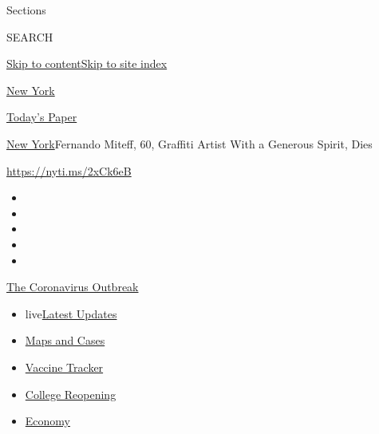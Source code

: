 Sections

SEARCH

\protect\hyperlink{site-content}{Skip to
content}\protect\hyperlink{site-index}{Skip to site index}

\href{https://www.nytimes.com/section/nyregion}{New York}

\href{https://myaccount.nytimes.com/auth/login?response_type=cookie\&client_id=vi}{}

\href{https://www.nytimes.com/section/todayspaper}{Today's Paper}

\href{/section/nyregion}{New York}\textbar{}Fernando Miteff, 60,
Graffiti Artist With a Generous Spirit, Dies

\url{https://nyti.ms/2xCk6eB}

\begin{itemize}
\item
\item
\item
\item
\item
\end{itemize}

\href{https://www.nytimes.com/news-event/coronavirus?action=click\&pgtype=Article\&state=default\&region=TOP_BANNER\&context=storylines_menu}{The
Coronavirus Outbreak}

\begin{itemize}
\tightlist
\item
  live\href{https://www.nytimes.com/2020/08/03/world/coronavirus-covid-19.html?action=click\&pgtype=Article\&state=default\&region=TOP_BANNER\&context=storylines_menu}{Latest
  Updates}
\item
  \href{https://www.nytimes.com/interactive/2020/us/coronavirus-us-cases.html?action=click\&pgtype=Article\&state=default\&region=TOP_BANNER\&context=storylines_menu}{Maps
  and Cases}
\item
  \href{https://www.nytimes.com/interactive/2020/science/coronavirus-vaccine-tracker.html?action=click\&pgtype=Article\&state=default\&region=TOP_BANNER\&context=storylines_menu}{Vaccine
  Tracker}
\item
  \href{https://www.nytimes.com/2020/08/02/us/covid-college-reopening.html?action=click\&pgtype=Article\&state=default\&region=TOP_BANNER\&context=storylines_menu}{College
  Reopening}
\item
  \href{https://www.nytimes.com/live/2020/08/03/business/stock-market-today-coronavirus?action=click\&pgtype=Article\&state=default\&region=TOP_BANNER\&context=storylines_menu}{Economy}
\end{itemize}

